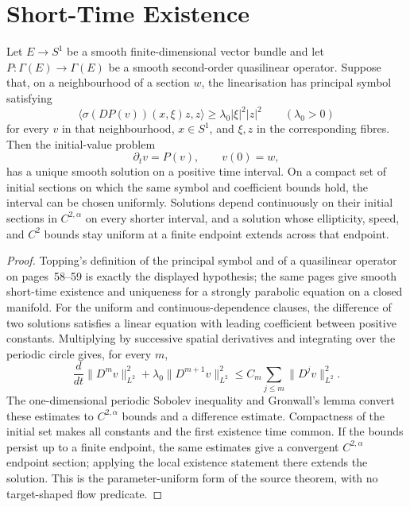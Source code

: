 \section{Short-Time Existence}

\begin{lemma}
\label{lem:strongly-parabolic-circle-equation}
\notready
Let $E\to S^1$ be a smooth finite-dimensional vector bundle and let
$P\colon\Gamma(E)\to\Gamma(E)$ be a smooth second-order quasilinear operator.
Suppose that, on a neighbourhood of a section $w$, the linearisation has
principal symbol satisfying
\[
 \langle\sigma(DP(v))(x,\xi)z,z\rangle
 \ge \lambda_0|\xi|^2|z|^2
 \qquad(\lambda_0>0)
\]
for every $v$ in that neighbourhood, $x\in S^1$, and $\xi,z$ in the
corresponding fibres.  Then the initial-value problem
\[
 \partial_t v=P(v),\qquad v(0)=w,
\]
has a unique smooth solution on a positive time interval.  On a compact set
of initial sections on which the same symbol and coefficient bounds hold, the
interval can be chosen uniformly.  Solutions depend continuously on their
initial sections in $C^{2,\alpha}$ on every shorter interval, and a solution
whose ellipticity, speed, and $C^2$ bounds stay uniform at a finite endpoint
extends across that endpoint.
\end{lemma}
\begin{proof}
Topping's definition of the principal symbol and of a quasilinear operator on
pages~58--59 is exactly the displayed hypothesis; the same pages give
smooth short-time existence and uniqueness for a strongly parabolic equation
on a closed manifold.  For the uniform and continuous-dependence clauses, the
difference of two solutions satisfies a linear equation with leading
coefficient between positive constants.  Multiplying by successive spatial
derivatives and integrating over the periodic circle gives, for every $m$,
\[
 \frac{d}{dt}\|D^m v\|_{L^2}^2
 +\lambda_0\|D^{m+1}v\|_{L^2}^2
 \le C_m\sum_{j\le m}\|D^jv\|_{L^2}^2.
\]
The one-dimensional periodic Sobolev inequality and Gronwall's lemma convert
these estimates to $C^{2,\alpha}$ bounds and a difference estimate.  Compactness
of the initial set makes all constants and the first existence time common.
If the bounds persist up to a finite endpoint, the same estimates give a
convergent $C^{2,\alpha}$ endpoint section; applying the local existence
statement there extends the solution.  This is the parameter-uniform form of
the source theorem, with no target-shaped flow predicate.
\end{proof}

